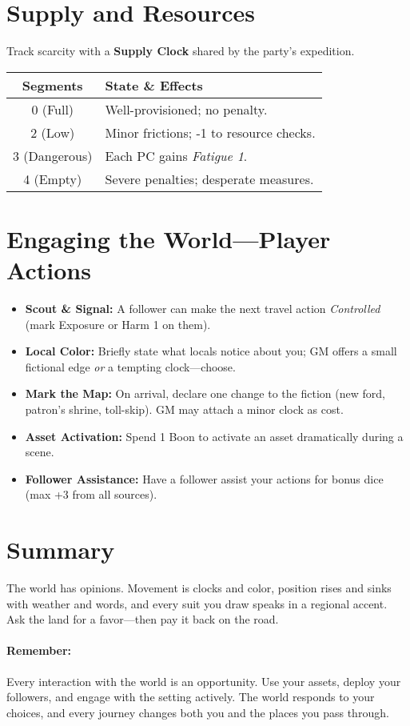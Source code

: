 \section{Supply and Resources}
\label{world:supply}
Track scarcity with a \textbf{Supply Clock} shared by the party's expedition.
\begin{center}
\begin{tabular}{cl}
\toprule
\textbf{Segments} & \textbf{State \& Effects} \\
\midrule
0 (Full) & Well-provisioned; no penalty. \\
2 (Low) & Minor frictions; -1 to resource checks. \\
3 (Dangerous) & Each PC gains \emph{Fatigue 1}. \\
4 (Empty) & Severe penalties; desperate measures. \\
\bottomrule
\end{tabular}
\end{center}

\section{Engaging the World—Player Actions}
\begin{itemize}
\item \textbf{Scout \& Signal:} A follower can make the next travel action \emph{Controlled} (mark Exposure or Harm 1 on them).
\item \textbf{Local Color:} Briefly state what locals notice about you; GM offers a small fictional edge \emph{or} a tempting clock—choose.
\item \textbf{Mark the Map:} On arrival, declare one change to the fiction (new ford, patron's shrine, toll-skip). GM may attach a minor clock as cost.
\item \textbf{Asset Activation:} Spend 1 Boon to activate an asset dramatically during a scene.
\item \textbf{Follower Assistance:} Have a follower assist your actions for bonus dice (max +3 from all sources).
\end{itemize}

\section{Summary}
The world has opinions. Movement is clocks and color, position rises and sinks with weather and words, and every suit you draw speaks in a regional accent. Ask the land for a favor—then pay it back on the road.

\paragraph{Remember:} Every interaction with the world is an opportunity. Use your assets, deploy your followers, and engage with the setting actively. The world responds to your choices, and every journey changes both you and the places you pass through.